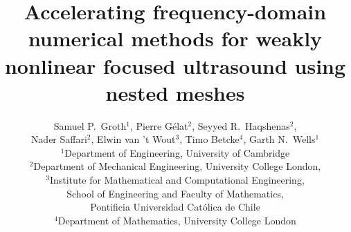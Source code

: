 \documentclass[11pt]{article}
\numberwithin{equation}{section}
\newcommand{\red}[1]{{\color{black} #1}}
\begin{document}
\title{\red{Accelerating frequency-domain numerical methods for 
weakly nonlinear focused ultrasound using nested meshes}}
\author{Samuel P.~Groth$^1$, Pierre G\'{e}lat$^2$, Seyyed R.~Haqshenas$^{2}$, \\ 
Nader Saffari$^2$, Elwin van 't Wout$^3$, Timo Betcke$^4$, Garth N.~Wells$^1$\\[6pt]
$^1$Department of Engineering, University of Cambridge \\[4pt] %
$^2$Department of Mechanical Engineering, University College London, \\[4pt] %
$^3$Institute for Mathematical and Computational Engineering, \\
School of Engineering and Faculty of Mathematics, \\
            Pontificia Universidad Cat\'olica de Chile \\ [4pt]
$^4$Department of Mathematics, University College London} %

\end{document}
